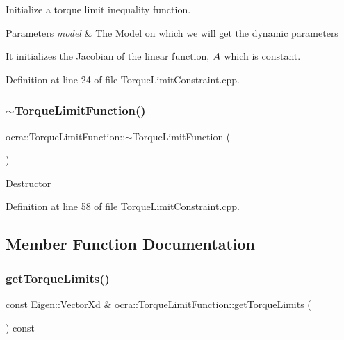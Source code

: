 Initialize a torque limit inequality function.


\begin{DoxyParams}{Parameters}
{\em model} & The Model on which we will get the dynamic parameters\\
\hline
\end{DoxyParams}
It initializes the Jacobian of the linear function, $ A $ which is constant. 

Definition at line 24 of file Torque\+Limit\+Constraint.\+cpp.

\hypertarget{classocra_1_1TorqueLimitFunction_a810eb8dd094bb809859a6adf9c6c4a18}{}\label{classocra_1_1TorqueLimitFunction_a810eb8dd094bb809859a6adf9c6c4a18} 
\subsubsection{\texorpdfstring{$\sim$\+Torque\+Limit\+Function()}{~TorqueLimitFunction()}}
{\footnotesize\ttfamily ocra\+::\+Torque\+Limit\+Function\+::$\sim$\+Torque\+Limit\+Function (\begin{DoxyParamCaption}{ }\end{DoxyParamCaption})}

Destructor 

Definition at line 58 of file Torque\+Limit\+Constraint.\+cpp.



\subsection{Member Function Documentation}
\hypertarget{classocra_1_1TorqueLimitFunction_a455115a2dc26da5603bbf843bb88ef38}{}\label{classocra_1_1TorqueLimitFunction_a455115a2dc26da5603bbf843bb88ef38} 
\subsubsection{\texorpdfstring{get\+Torque\+Limits()}{getTorqueLimits()}}
{\footnotesize\ttfamily const Eigen\+::\+Vector\+Xd \& ocra\+::\+Torque\+Limit\+Function\+::get\+Torque\+Limits (\begin{DoxyParamCaption}{ }\end{DoxyParamCaption}) const}

